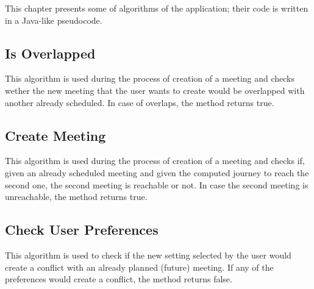 This chapter presents some of algorithms of the application; their code is written in a Java-like pseudocode.



 
\lstset{style=mystyle}

\subsection{Is Overlapped}
This algorithm is used during the process of creation of a meeting and checks wether the new meeting that the user wants to create would be overlapped with another already scheduled.
In case of overlaps, the method returns true.


\subsection{Create Meeting}
This algorithm is used during the process of creation of a meeting and checks if, given an already scheduled meeting and given the computed journey to reach the second one, the second meeting is reachable or not.
In case the second meeting is unreachable, the method returns true.



\subsection{Check User Preferences}
This algorithm is used to check if the new setting selected by the user would create a conflict with an already planned (future) meeting.
If any of the preferences would create a conflict, the method returns false.

